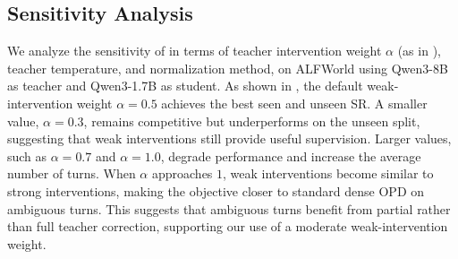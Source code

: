 \subsection{Sensitivity Analysis}
\label{sec:sensitivity_analysis}

\begin{table}[t]
\centering
\caption{
    Sensitivity analysis on ALFWorld using Qwen3-8B as teacher and Qwen3-1.7B as student. 
    The default configuration uses $\alpha=0.5$, teacher temperature $0.0$, and standard loss normalization over all student tokens.
}
\vspace{-0.1in}
\label{tab:sensitivity}
\setlength{\tabcolsep}{20pt}
\end{table}

We analyze the sensitivity of \ours in terms of teacher intervention weight $\alpha$ (as in ), teacher temperature, and normalization method, on ALFWorld using Qwen3-8B as teacher and Qwen3-1.7B as student.
%
As shown in , the default weak-intervention weight $\alpha=0.5$ achieves the best seen and unseen SR.
%
A smaller value, $\alpha=0.3$, remains competitive but underperforms on the unseen split, suggesting that weak interventions still provide useful supervision.
%
Larger values, such as $\alpha=0.7$ and $\alpha=1.0$, degrade performance and increase the average number of turns.
%
When $\alpha$ approaches $1$, weak interventions become similar to strong interventions, making the objective closer to standard dense OPD on ambiguous turns.
%
This suggests that ambiguous turns benefit from partial rather than full teacher correction, supporting our use of a moderate weak-intervention weight.
%

